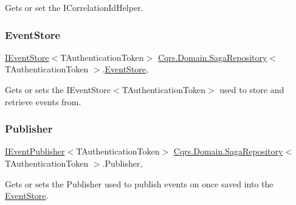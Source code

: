 Gets or set the I\+Correlation\+Id\+Helper. 

\mbox{\label{classCqrs_1_1Domain_1_1SagaRepository_a4b872f1a20660ece8ce1b54720193fda_a4b872f1a20660ece8ce1b54720193fda}} 
\subsubsection{\texorpdfstring{Event\+Store}{EventStore}}
{\footnotesize\ttfamily \hyperlink{interfaceCqrs_1_1Events_1_1IEventStore}{I\+Event\+Store}$<$T\+Authentication\+Token$>$ \hyperlink{classCqrs_1_1Domain_1_1SagaRepository}{Cqrs.\+Domain.\+Saga\+Repository}$<$ T\+Authentication\+Token $>$.\hyperlink{classCqrs_1_1Events_1_1EventStore}{Event\+Store}\hspace{0.3cm}{\ttfamily [get]}, {\ttfamily [protected]}}



Gets or sets the I\+Event\+Store$<$\+T\+Authentication\+Token$>$ used to store and retrieve events from. 

\mbox{\label{classCqrs_1_1Domain_1_1SagaRepository_a94707dc4549d096ea3cf5d241117495a_a94707dc4549d096ea3cf5d241117495a}} 
\subsubsection{\texorpdfstring{Publisher}{Publisher}}
{\footnotesize\ttfamily \hyperlink{interfaceCqrs_1_1Events_1_1IEventPublisher}{I\+Event\+Publisher}$<$T\+Authentication\+Token$>$ \hyperlink{classCqrs_1_1Domain_1_1SagaRepository}{Cqrs.\+Domain.\+Saga\+Repository}$<$ T\+Authentication\+Token $>$.Publisher\hspace{0.3cm}{\ttfamily [get]}, {\ttfamily [protected]}}



Gets or sets the Publisher used to publish events on once saved into the \hyperlink{namespaceCqrs_1_1EventStore}{Event\+Store}. 

